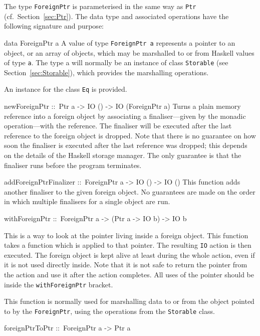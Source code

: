 \documentclass[a4paper,twosides]{article}
\makeatletter
\newcommand{\code}[1]{\texttt{#1}}      %
\newenvironment{codedesc}{%
  \list{}{\labelwidth\z@ %
    \let\makelabel\codedesclabel}
  }{%
  \endlist
  }
\newcommand*{\codedesclabel}[1]{%
  \hspace{-\leftmargin}
  \parbox[b]{\labelwidth}{\makebox[0pt][l]{\code{#1}}\\}\hfil\relax
  }
\makeatother
\begin{document}
The type \code{ForeignPtr} is parameterised in the same way as \code{Ptr}
(cf.\ Section~\ref{sec:Ptr}).  The data type and associated operations have
the following signature and purpose:
%
\begin{codedesc}
\item[data ForeignPtr a] A value of type \code{ForeignPtr a} represents a
  pointer to an object, or an array of objects, which may be marshalled to or
  from Haskell values of type \code{a}.  The type a will normally be an
  instance of class \code{Storable} (see Section~\ref{sec:Storable}), which
  provides the marshalling operations.
  
  An instance for the class \code{Eq} is provided.
  
\item[newForeignPtr ::\ Ptr a -> IO () -> IO (ForeignPtr a)] Turns a plain
  memory reference into a foreign object by associating a finaliser---given by
  the monadic operation---with the reference. The finaliser will be executed
  after the last reference to the foreign object is dropped. Note that there
  is no guarantee on how soon the finaliser is executed after the last
  reference was dropped; this depends on the details of the Haskell storage
  manager. The only guarantee is that the finaliser runs before the program
  terminates.  
  
\item[addForeignPtrFinalizer ::\ ForeignPtr a -> IO () -> IO ()] This function
  adds another finaliser to the given foreign object. No guarantees are made
  on the order in which multiple finalisers for a single object are run.

\item[withForeignPtr ::\ ForeignPtr a -> (Ptr a -> IO b) -> IO b]
  
  This is a way to look at the pointer living inside a foreign object. This
  function takes a function which is applied to that pointer. The resulting
  \code{IO} action is then executed. The foreign object is kept alive at least
  during the whole action, even if it is not used directly inside. Note that
  it is not safe to return the pointer from the action and use it after the
  action completes. All uses of the pointer should be inside the
  \code{withForeignPtr} bracket.
  
  This function is normally used for marshalling data to or from the object
  pointed to by the \code{ForeignPtr}, using the operations from the
  \code{Storable} class.

\item[foreignPtrToPtr ::\ ForeignPtr a -> Ptr a]
  

\end{codedesc}
\end{document}
